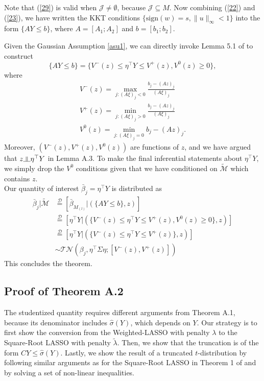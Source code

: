 \documentclass[11pt]{article}
\newcommand{\sgn}{\textrm{sign}}
\newcommand{\NL}{\\[.4cm]}
\newcommand{\indep}{\rotatebox[origin=c]{90}{$\models$}}
\begin{document}
	Note that (\ref{29}) is valid when $\mathcal{J}\neq\emptyset$, because $\mathcal{J}\subseteq M$. Now combining (\ref{22}) and (\ref{23}), we have written the KKT conditions $\{\sgn(w)=s,\|u\|_\infty<1\}$ into the form $\{AY\leq b\}$, where $A=[A_1;A_2]$ and $b=[b_1;b_2]$. 
	
	Given the Gaussian Assumption \ref{asu1}, we can directly invoke Lemma 5.1 of \cite{lee2016exact} to construct
	\begin{equation}
		\{AY\leq b\}=\{V^-(z)\leq \eta^\top Y\leq V^+(z),V^0(z)\geq 0 \},
	\end{equation}
	where 
	\begin{equation}
		\begin{split}
			V^{-}(z)=\max_{j:(A\xi)_j<0}\frac{b_j-(Az)_j}{(A\xi)_j}\\
			V^{+}(z)=\min_{j:(A\xi)_j>0}\frac{b_j-(Az)_j}{(A\xi)_j}\\
			V^0(z)=\min_{j:(A\xi)_j=0}b_j-(Az)_j.
		\end{split}
	\end{equation}
	Moreover, $(V^{-}(z),V^{+}(z),V^{0}(z))$ are functions of $z$, and we have argued that $z\indep \eta^\top Y$ in Lemma A.3. To make the final inferential statements about $\eta^\top Y$, we simply drop the $V^0$ conditions given that we have conditioned on $\tilde{\mathcal{M}}$ which contains $z$.\NL
	Our quantity of interest $\bar{\beta}_{j}=\eta^\top Y$ is distributed as
	\begin{equation}
		\begin{split}
			\bar{\beta}_{j}|\tilde{\mathcal{M}}&\stackrel{\mathcal{D}}{=}[\bar{\beta}_{M_{(l)}}|(\{AY\leq b\},z)]\\
			&\stackrel{\mathcal{D}}{=}[\eta^\top Y|(\{V^-(z)\leq \eta^\top Y\leq V^+(z),V^0(z)\geq 0 \},z)]\\
			&\stackrel{\mathcal{D}}{=}[\eta^\top Y|(\{V^-(z)\leq \eta^\top Y\leq V^+(z)\},z)]\\
			&\sim\mathcal{TN}(\beta_{j},\eta^\top \Sigma\eta;[V^{-}(z),V^{+}(z)] )
		\end{split}
	\end{equation}
	This concludes the theorem.
	
	
	\subsection{Proof of Theorem A.2}\label{pf:app-thm1}
	
The studentized quantity requires different arguments from Theorem A.1, because its denominator includes $\hat{\sigma}(Y)$, which depends on $Y$. Our strategy is to first show the conversion from the Weighted-LASSO with penalty $\lambda$ to the Square-Root LASSO with penalty $\tilde{\lambda}$. Then, we show that the truncation is of the form $C Y\leq\hat{\sigma}(Y)$. Lastly, we show the result of a truncated $t$-distribution by following similar arguments as for the Square-Root LASSO in Theorem 1 of \cite{tian2017selective} and by solving a set of non-linear inequalities. 
	
\end{document}
